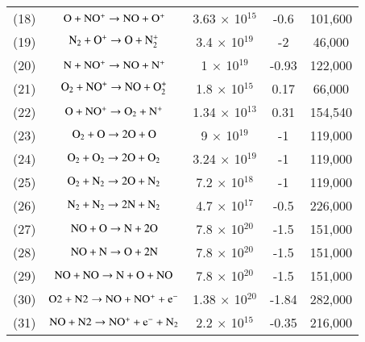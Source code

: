 \documentclass{warpdoc}
\begin{document}
\begin{table}[t]
\begin{center}
\begin{threeparttable}
\begin{tabular}{ccccc}
(18) & $\rm O + NO^+ \rightarrow NO + O^+$ & 3.63 $\times$ 10$^{15}$ & -0.6 & 101,600 \\
(19) & $\rm N_2 + O^+ \rightarrow O + N_2^{+}$ & 3.4 $\times$ 10$^{19}$ & -2 & 46,000 \\
(20) & $\rm N + NO^+ \rightarrow NO + N^+$ & 1 $\times$ 10$^{19}$ & -0.93 & 122,000 \\
(21) & $\rm O_2 + NO^+ \rightarrow NO + O_2^{+}$ & 1.8 $\times$ 10$^{15}$ & 0.17 & 66,000 \\
(22) & $\rm O + NO^+ \rightarrow O_2 + N^+$ & 1.34 $\times$ 10$^{13}$ & 0.31 & 154,540 \\
(23) & $\rm O_2 + O \rightarrow 2O + O$ & 9 $\times$ 10$^{19}$ & -1 & 119,000 \\
(24) & $\rm O_2 + O_2 \rightarrow 2O + O_2$ & 3.24 $\times$ 10$^{19}$ & -1 & 119,000 \\
(25) & $\rm O_2 + N_2 \rightarrow 2O + N_2$ & 7.2 $\times$ 10$^{18}$ & -1 & 119,000 \\
(26) & $\rm N_2 + N_2 \rightarrow 2N + N_2$ & 4.7 $\times$ 10$^{17}$ & -0.5 & 226,000 \\
(27) & $\rm NO + O \rightarrow N + 2O$ & 7.8 $\times$ 10$^{20}$ & -1.5 & 151,000 \\
(28) & $\rm NO + N \rightarrow O + 2N$ & 7.8 $\times$ 10$^{20}$ & -1.5 & 151,000 \\
(29) & $\rm NO + NO \rightarrow N + O + NO$ & 7.8 $\times$ 10$^{20}$ & -1.5 & 151,000 \\
(30) & $\rm O2 + N2 \rightarrow NO + NO^+ + e^-$ & 1.38 $\times$ 10$^{20}$ & -1.84 & 282,000 \\
(31) & $\rm NO + N2 \rightarrow NO^+ + e^- + N_2$ & 2.2 $\times$ 10$^{15}$ & -0.35 & 216,000 \\
\bottomrule
\end{tabular}
\label{tab:dunn-kang}
\end{threeparttable}
\end{center}
\end{table}
%
\end{document}
